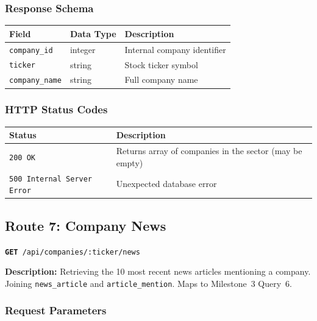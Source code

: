 \documentclass[11pt]{article}
\newcommand{\route}[2]{\texttt{\textcolor{routecolor}{\textbf{#1}}~#2}}
\begin{document}
\subsubsection*{Response Schema}

\begin{center}
\small
\begin{tabular}{l l p{7cm}}
\toprule
\textbf{Field} & \textbf{Data Type} & \textbf{Description} \\
\midrule
\texttt{company\_id}   & integer & Internal company identifier \\
\texttt{ticker}        & string  & Stock ticker symbol \\
\texttt{company\_name} & string  & Full company name \\
\bottomrule
\end{tabular}
\end{center}

\subsubsection*{HTTP Status Codes}

\begin{center}
\small
\begin{tabular}{l p{8cm}}
\toprule
\textbf{Status} & \textbf{Description} \\
\midrule
\texttt{200 OK} & Returns array of companies in the sector (may be empty) \\
\texttt{500 Internal Server Error} & Unexpected database error \\
\bottomrule
\end{tabular}
\end{center}

\newpage
\subsection{Route 7: Company News}

\route{GET}{/api/companies/:ticker/news}

\medskip\noindent
\textbf{Description:} Retrieving the 10 most recent news articles mentioning a company. Joining \texttt{news\_article} and \texttt{article\_mention}. Maps to Milestone~3 Query~6.

\subsubsection*{Request Parameters}
\end{document}
